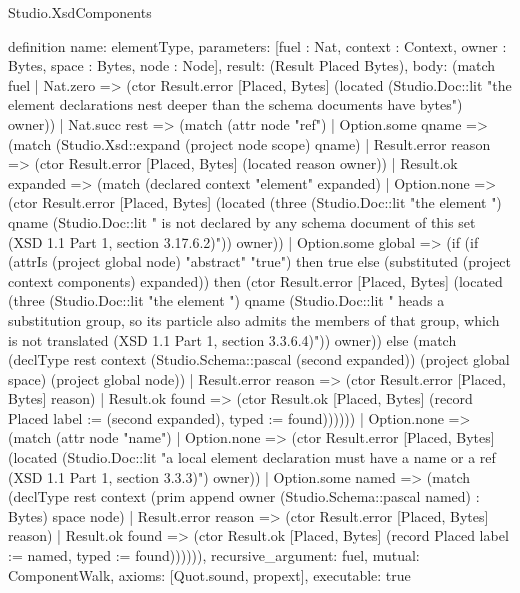 \begin{lexlean}{Studio.XsdComponents}
\begin{semanticmodule}
definition{
  name: elementType,
  parameters: [fuel : Nat, context : Context, owner : Bytes, space : Bytes, node : Node],
  result: (Result Placed Bytes),
  body: (match fuel
    | Nat.zero => (ctor Result.error [Placed, Bytes] (located (Studio.Doc::lit "the element declarations nest deeper than the schema documents have bytes") owner))
    | Nat.succ rest => (match (attr node "ref")
      | Option.some qname => (match (Studio.Xsd::expand (project node scope) qname)
        | Result.error reason => (ctor Result.error [Placed, Bytes] (located reason owner))
        | Result.ok expanded => (match (declared context "element" expanded)
          | Option.none => (ctor Result.error [Placed, Bytes] (located (three (Studio.Doc::lit "the element ") qname (Studio.Doc::lit " is not declared by any schema document of this set (XSD 1.1 Part 1, section 3.17.6.2)")) owner))
          | Option.some global => (if (if (attrIs (project global node) "abstract" "true") then true else (substituted (project context components) expanded)) then (ctor Result.error [Placed, Bytes] (located (three (Studio.Doc::lit "the element ") qname (Studio.Doc::lit " heads a substitution group, so its particle also admits the members of that group, which is not translated (XSD 1.1 Part 1, section 3.3.6.4)")) owner)) else (match (declType rest context (Studio.Schema::pascal (second expanded)) (project global space) (project global node))
            | Result.error reason => (ctor Result.error [Placed, Bytes] reason)
            | Result.ok found => (ctor Result.ok [Placed, Bytes] (record Placed {label := (second expanded), typed := found}))))))
      | Option.none => (match (attr node "name")
        | Option.none => (ctor Result.error [Placed, Bytes] (located (Studio.Doc::lit "a local element declaration must have a name or a ref (XSD 1.1 Part 1, section 3.3.3)") owner))
        | Option.some named => (match (declType rest context (prim append owner (Studio.Schema::pascal named) : Bytes) space node)
          | Result.error reason => (ctor Result.error [Placed, Bytes] reason)
          | Result.ok found => (ctor Result.ok [Placed, Bytes] (record Placed {label := named, typed := found})))))),
  recursive_argument: fuel,
  mutual: ComponentWalk,
  axioms: [Quot.sound, propext],
  executable: true
}


\end{semanticmodule}
\end{lexlean}
